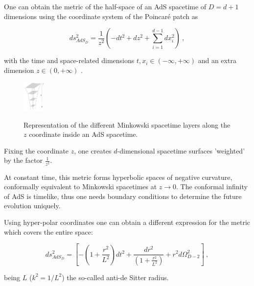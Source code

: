 \documentclass[twocolumn]{revtex4}
\providecommand{\eq}[2]{
    \begin{equation}
        #2
    \label{eq:#1}
    \end{equation}
}
\begin{document}


One can obtain the metric of the half-space of an AdS spacetime of $D=d+1$ dimensions using the coordinate system of the Poincaré patch as
\eq{AdS_PP-metric}{
    ds_{AdS_D}^2 = \frac{1}{z^2} \left( -dt^2 + dz^2 + \sum_{i=1}^{d-1} dx_i^2 \right) \ ,
}
with the time and space-related dimensions $t , x_i \in (-\infty,+\infty)$ and an extra dimension $z \in (0,+\infty)$ \cite{kaplan_lectures_nodate}.

\begin{figure}
    \centering
    \includegraphics[width=0.1\textwidth]{../Imatges/Extern/Captura_Superficies_z.png}
    \label{fig:AdS_z-surfaces}
    \caption{Representation of the different Minkowski spacetime layers along the $z$ coordinate inside an AdS spacetime.}
\end{figure}

Fixing the coordinate $z$, one creates $d$-dimensional spacetime surfaces 'weighted' by the factor $\frac{1}{z^2}$.

At constant time, \cite{} this metric forms hyperbolic spaces of negative curvature, conformally equivalent to Minkowski spacetimes at $z \to 0$. The conformal infinity of AdS is timelike, thus one needs boundary conditions to determine the future evolution uniquely.

Using hyper-polar coordinates one can obtain a different expression for the metric which covers the entire space:
\eq{AdS_hyper-polar-metric}{
    ds_{AdS_D}^2 = \left [ - \left ( 1 + \frac{r^2}{L^2} \right ) dt^2 + \frac{dr^2}{\left ( 1+ \frac{r^2}{L^2} \right )} + r^2 d \Omega_{D-2}^2 \right ] \ ,
}
being $L$ ($k^2=1/L^2$) the so-called anti-de Sitter radius.
\end{document}
